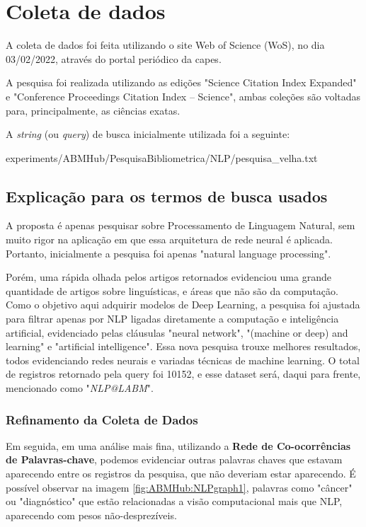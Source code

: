 \section{Coleta de dados}

A coleta de dados foi feita utilizando o site Web of Science (WoS), no dia 03/02/2022, através do portal periódico da capes.

A pesquisa foi realizada utilizando as edições "Science Citation Index Expanded" e "Conference Proceedings Citation Index – Science", ambas coleções são voltadas para, principalmente, as ciências exatas.

A \textit{string} (ou \textit{query}) de busca inicialmente utilizada foi a seguinte:


{experiments/ABMHub/PesquisaBibliometrica/NLP/pesquisa_velha.txt}

\subsection{Explicação para os termos de busca usados}
\label{sec:ABMHub:query}

A proposta é apenas pesquisar sobre Processamento de Linguagem Natural, sem muito rigor na aplicação em que essa arquitetura de rede neural é aplicada. Portanto, inicialmente a pesquisa foi apenas "natural language processing".

Porém, uma rápida olhada pelos artigos retornados evidenciou uma grande quantidade de artigos sobre linguísticas, e áreas que não são da computação. Como o objetivo aqui adquirir modelos de Deep Learning, a pesquisa foi ajustada para filtrar apenas por NLP ligadas diretamente a computação e inteligência artificial, evidenciado pelas cláusulas "neural network", "(machine or deep) and learning" e "artificial intelligence". Essa nova pesquisa trouxe melhores resultados, todos evidenciando redes neurais e variadas técnicas de machine learning. O total de registros retornado pela query foi 10152, e esse dataset será, daqui para frente, mencionado como "\textit{NLP@LABM}".

\subsubsection{Refinamento da Coleta de Dados}
\label{sec:abmhub:refinamento}

 Em seguida, em uma análise mais fina, utilizando a \textbf{Rede de Co-ocorrências de Palavras-chave}, podemos evidenciar outras palavras chaves que estavam aparecendo entre os registros da pesquisa, que não deveriam estar aparecendo. É possível observar na imagem \ref{fig:ABMHub:NLPgraph1}, palavras como "câncer" ou "diagnóstico" que estão relacionadas a visão computacional mais que NLP, aparecendo com pesos não-desprezíveis.
 
